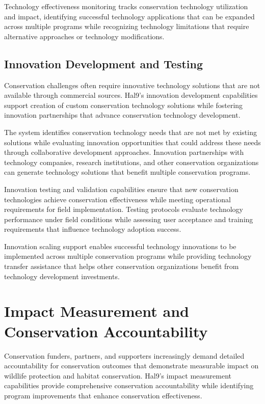 \documentclass[
  Letterpaper,
]{scrbook}
\begin{document}
Technology effectiveness monitoring tracks conservation technology
utilization and impact, identifying successful technology applications
that can be expanded across multiple programs while recognizing
technology limitations that require alternative approaches or technology
modifications.

\subsection{Innovation Development and
Testing}\label{innovation-development-and-testing}

Conservation challenges often require innovative technology solutions
that are not available through commercial sources. Hal9's innovation
development capabilities support creation of custom conservation
technology solutions while fostering innovation partnerships that
advance conservation technology development.

The system identifies conservation technology needs that are not met by
existing solutions while evaluating innovation opportunities that could
address these needs through collaborative development approaches.
Innovation partnerships with technology companies, research
institutions, and other conservation organizations can generate
technology solutions that benefit multiple conservation programs.

Innovation testing and validation capabilities ensure that new
conservation technologies achieve conservation effectiveness while
meeting operational requirements for field implementation. Testing
protocols evaluate technology performance under field conditions while
assessing user acceptance and training requirements that influence
technology adoption success.

Innovation scaling support enables successful technology innovations to
be implemented across multiple conservation programs while providing
technology transfer assistance that helps other conservation
organizations benefit from technology development investments.

\section{Impact Measurement and Conservation
Accountability}\label{impact-measurement-and-conservation-accountability}

Conservation funders, partners, and supporters increasingly demand
detailed accountability for conservation outcomes that demonstrate
measurable impact on wildlife protection and habitat conservation.
Hal9's impact measurement capabilities provide comprehensive
conservation accountability while identifying program improvements that
enhance conservation effectiveness.
\end{document}
